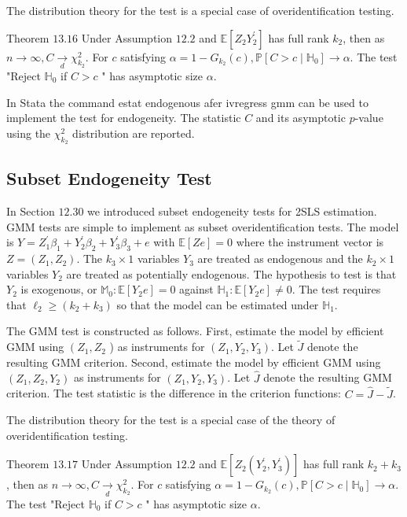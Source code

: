 \documentclass[10pt]{article}
\begin{document}
The distribution theory for the test is a special case of overidentification testing.

Theorem $13.16$ Under Assumption $12.2$ and $\mathbb{E}\left[Z_{2} Y_{2}^{\prime}\right]$ has full rank $k_{2}$, then as $n \rightarrow \infty, C \underset{d}{\rightarrow} \chi_{k_{2}}^{2}$. For $c$ satisfying $\alpha=1-G_{k_{2}}(c), \mathbb{P}\left[C>c \mid \mathbb{H}_{0}\right] \rightarrow \alpha$. The test "Reject $\mathbb{H}_{0}$ if $C>c$ " has asymptotic size $\alpha$.

In Stata the command estat endogenous afer ivregress gmm can be used to implement the test for endogeneity. The statistic $C$ and its asymptotic $p$-value using the $\chi_{k_{2}}^{2}$ distribution are reported.

\subsection{Subset Endogeneity Test}
In Section $12.30$ we introduced subset endogeneity tests for 2SLS estimation. GMM tests are simple to implement as subset overidentification tests. The model is $Y=Z_{1}^{\prime} \beta_{1}+Y_{2}^{\prime} \beta_{2}+Y_{3}^{\prime} \beta_{3}+e$ with $\mathbb{E}[Z e]=0$ where the instrument vector is $Z=\left(Z_{1}, Z_{2}\right)$. The $k_{3} \times 1$ variables $Y_{3}$ are treated as endogenous and the $k_{2} \times 1$ variables $Y_{2}$ are treated as potentially endogenous. The hypothesis to test is that $Y_{2}$ is exogenous, or $\mathbb{M}_{0}: \mathbb{E}\left[Y_{2} e\right]=0$ against $\mathbb{H}_{1}: \mathbb{E}\left[Y_{2} e\right] \neq 0$. The test requires that $\ell_{2} \geq\left(k_{2}+k_{3}\right)$ so that the model can be estimated under $\mathbb{H}_{1}$.

The GMM test is constructed as follows. First, estimate the model by efficient GMM using $\left(Z_{1}, Z_{2}\right.$ ) as instruments for $\left(Z_{1}, Y_{2}, Y_{3}\right)$. Let $\widetilde{J}$ denote the resulting GMM criterion. Second, estimate the model by efficient GMM using $\left(Z_{1}, Z_{2}, Y_{2}\right)$ as instruments for $\left(Z_{1}, Y_{2}, Y_{3}\right)$. Let $\widehat{J}$ denote the resulting GMM criterion. The test statistic is the difference in the criterion functions: $C=\widehat{J}-\widetilde{J}$.

The distribution theory for the test is a special case of the theory of overidentification testing.

Theorem $13.17$ Under Assumption $12.2$ and $\mathbb{E}\left[Z_{2}\left(Y_{2}^{\prime}, Y_{3}^{\prime}\right)\right]$ has full rank $k_{2}+k_{3}$, then as $n \rightarrow \infty, C \underset{d}{\longrightarrow} \chi_{k_{2}}^{2}$. For $c$ satisfying $\alpha=1-G_{k_{2}}(c), \mathbb{P}\left[C>c \mid \mathbb{H}_{0}\right] \longrightarrow \alpha$. The test "Reject $\mathbb{H}_{0}$ if $C>c$ " has asymptotic size $\alpha$.
\end{document}
